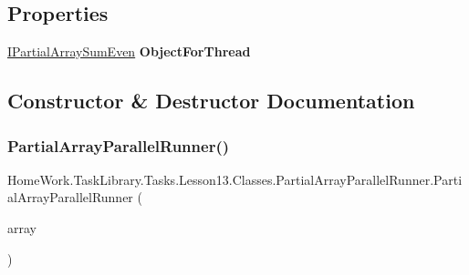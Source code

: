 \subsection*{Properties}
\begin{DoxyCompactItemize}
\item 
\mbox{\label{class_home_work_1_1_task_library_1_1_tasks_1_1_lesson13_1_1_classes_1_1_partial_array_parallel_runner_a68bb947ae363f4032fa43dc0e0266e64}} 
\mbox{\hyperlink{interface_home_work_1_1_task_library_1_1_tasks_1_1_lesson13_1_1_interfaces_1_1_i_partial_array_sum_even}{I\+Partial\+Array\+Sum\+Even}} {\bfseries Object\+For\+Thread}
\end{DoxyCompactItemize}


\subsection{Constructor \& Destructor Documentation}
\mbox{\label{class_home_work_1_1_task_library_1_1_tasks_1_1_lesson13_1_1_classes_1_1_partial_array_parallel_runner_a330e50c3deee343adea29eda23cb192b}} 
\subsubsection{\texorpdfstring{PartialArrayParallelRunner()}{PartialArrayParallelRunner()}}
{\footnotesize\ttfamily Home\+Work.\+Task\+Library.\+Tasks.\+Lesson13.\+Classes.\+Partial\+Array\+Parallel\+Runner.\+Partial\+Array\+Parallel\+Runner (\begin{DoxyParamCaption}\item[{\mbox{\hyperlink{interface_home_work_1_1_task_library_1_1_tasks_1_1_lesson13_1_1_interfaces_1_1_i_partial_array_sum_even}{I\+Partial\+Array\+Sum\+Even}}}]{array }\end{DoxyParamCaption})}




